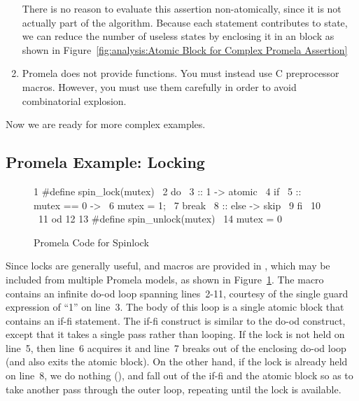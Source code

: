 \begin{enumerate}
	There is no reason to evaluate this assertion
	non-atomically, since it is not actually part of the algorithm.
	Because each statement contributes to state, we can reduce
	the number of useless states by enclosing it in an 
	block as shown in
	Figure~\ref{fig:analysis:Atomic Block for Complex Promela Assertion}

\item	Promela does not provide functions.
	You must instead use C preprocessor macros.
	However, you must use them carefully in order to avoid
	combinatorial explosion.
\end{enumerate}

Now we are ready for more complex examples.

\subsection{Promela Example: Locking}
\label{sec:formal:Promela Example: Locking}

\begin{figure}[tbp]
{ \scriptsize
\begin{verbbox}
  1 #define spin_lock(mutex) \
  2   do \
  3   :: 1 -> atomic { \
  4       if \
  5       :: mutex == 0 -> \
  6         mutex = 1; \
  7         break \
  8       :: else -> skip \
  9       fi \
 10     } \
 11   od
 12
 13 #define spin_unlock(mutex) \
 14   mutex = 0
\end{verbbox}
}
\centering
\theverbbox
\caption{Promela Code for Spinlock}
\label{fig:analysis:Promela Code for Spinlock}
\end{figure}

Since locks are generally useful,  and
\co{spin_unlock()}
macros are provided in , which may be included from
multiple Promela models, as shown in
Figure~\ref{fig:analysis:Promela Code for Spinlock}.
The  macro contains an infinite do-od loop
spanning lines~2-11,
courtesy of the single guard expression of ``1'' on line~3.
The body of this loop is a single atomic block that contains
an if-fi statement.
The if-fi construct is similar to the do-od construct, except
that it takes a single pass rather than looping.
If the lock is not held on line~5, then line~6 acquires it and
line~7 breaks out of the enclosing do-od loop (and also exits
the atomic block).
On the other hand, if the lock is already held on line~8,
we do nothing (\co{skip}), and fall out of the if-fi and the
atomic block so as to take another pass through the outer
loop, repeating until the lock is available.


